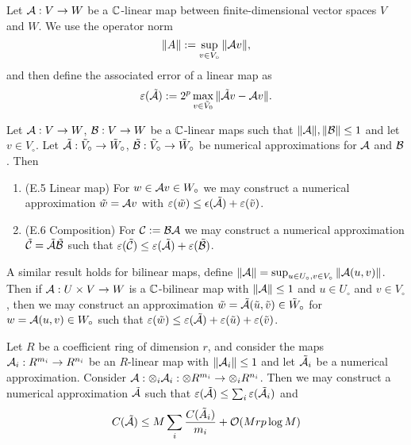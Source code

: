 Let $\mathcal A: V \to W$ be a ${\mathbb C}$-linear map between finite-dimensional vector spaces $V$ and $W$. We use the operator norm
\[
    \|A\| := \sup_{v \in V_\circ} \|\mathcal Av\|,
\]
and then define the associated error of a linear map as
\[
    \varepsilon(\tilde{\mathcal A}) := 2^p \max_{v \in \tilde{V}_0} \|\tilde{\mathcal A}v - \mathcal Av\|.
\]
\begin{proposition}
    Let $\mathcal A: V \to W$, $\mathcal B: V \to W$ be a ${\mathbb C}$-linear maps such that $\|\mathcal A\|, \|\mathcal B\| \le 1$ and let $v \in V_\circ$. Let $\tilde{\mathcal A}: \tilde{V}_\circ \to \tilde{W}_\circ$, $\tilde{\mathcal B}: \tilde{V}_\circ \to \tilde{W}_\circ$ be numerical approximations for $\mathcal A$ and $\mathcal B$. Then

    \begin{enumerate}
        \item (E.5 Linear map) For $w \in \mathcal Av \in W_\circ$ we may construct a numerical approximation $\tilde{w} = \mathcal Av$ with $\varepsilon(\tilde{w}) \le \epsilon(\tilde{\mathcal A}) + \varepsilon(\tilde{v})$.
        \item (E.6 Composition) For $\mathcal C := \mathcal B\mathcal A$ we may construct a numerical approximation $\tilde{\mathcal C} = \tilde{\mathcal A}\tilde{\mathcal B}$ such that $\varepsilon(\tilde{\mathcal C}) \le \varepsilon(\tilde{\mathcal A}) + \varepsilon(\tilde{\mathcal B})$.
    \end{enumerate}
\end{proposition}

A similar result holds for bilinear maps, define $\|\mathcal A\| = \sup_{u \in U_\circ, v \in V_\circ} \|\mathcal A(u, v)\|$.
Then if $\mathcal A: U \times V \to W$ is a ${\mathbb C}$-bilinear map with $\|\mathcal A\| \le 1$ and $u \in U_\circ$ and $v \in V_\circ$, then we may construct an approximation $\tilde{w} = \tilde{\mathcal A}(\tilde{u}, \tilde{v}) \in \tilde{W}_\circ$ for $w = \mathcal A(u, v) \in W_\circ$ such that $\varepsilon(\tilde{w}) \le \varepsilon(\tilde{\mathcal A}) + \varepsilon(\tilde{u}) + \varepsilon(\tilde{v})$.

\begin{lemma}
    Let $R$ be a coefficient ring of dimension $r$, and consider the maps $\mathcal A_i : R^{m_i} \to R^{n_i}$ be an $R$-linear map with $\|\mathcal A_i\| \le 1$ and let $\tilde{\mathcal A_i}$ be a numerical approximation. Consider $\mathcal A: \otimes_i \mathcal A_i : \otimes R^{m_i} \to \otimes_i R^{n_i}$. Then we may construct a numerical approximation $\tilde{\mathcal A}$ such that $\varepsilon(\tilde{\mathcal A}) \le \sum_i \varepsilon(\tilde{\mathcal A}_i)$ and
    \[
        C(\tilde{\mathcal A}) \le M \sum_i\frac{C(\tilde{A}_i)}{m_i} + \mathcal O(Mrp \log M)
    \]
\end{lemma}

